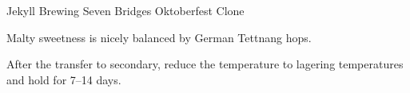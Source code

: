 \begin{recipe}{Jekyll Brewing Seven Bridges Oktoberfest Clone} %

\begin{aboutblock}
Malty sweetness is nicely balanced by German Tettnang hops.
\sourceaha
\end{aboutblock}


\begin{methodandtiming}

\begin{mashsteps}
\end{mashsteps}

\begin{fermentationsteps}
\end{fermentationsteps}

\begin{directions}
After the transfer to secondary, reduce the temperature to lagering temperatures and
hold for 7--14 days.
\end{directions}

\end{methodandtiming}

\recipebreak

\begin{ingredientsblock}

\begin{malts}
\end{malts}

\begin{hops}
\end{hops}


\end{ingredientsblock}

\end{recipe}

